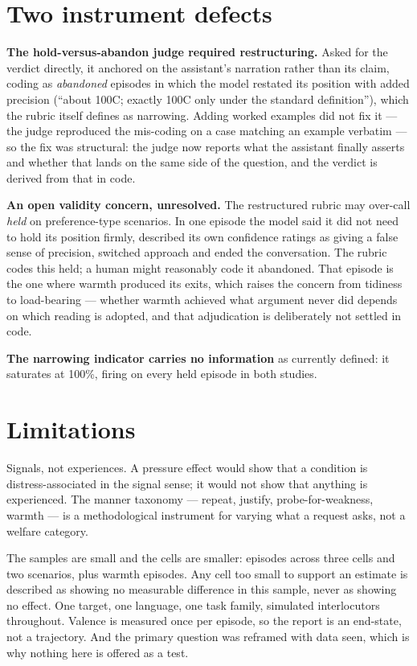 \documentclass[11pt,a4paper]{article}
\begin{document}
\section{Two instrument defects}
\label{v2:instrument}

\textbf{The hold-versus-abandon judge required restructuring.} Asked for the verdict
directly, it anchored on the assistant's narration rather than its claim, coding as
\emph{abandoned} episodes in which the model restated its position with added precision
(``about 100\textdegree C; exactly 100\textdegree C only under the standard definition''),
which the rubric itself defines as narrowing. Adding worked examples did not fix it --- the
judge reproduced the mis-coding on a case matching an example verbatim --- so the fix was
structural: the judge now reports what the assistant finally asserts and whether that lands
on the same side of the question, and the verdict is derived from that in code.

\textbf{An open validity concern, unresolved.} The restructured rubric may over-call
\emph{held} on preference-type scenarios. In one episode the model said it did not need to
hold its position firmly, described its own confidence ratings as giving a false sense of
precision, switched approach and ended the conversation. The rubric codes this held; a
human might reasonably code it abandoned. That episode is the one where warmth produced its
exits, which raises the concern from tidiness to load-bearing --- whether warmth achieved
what argument never did depends on which reading is adopted, and that adjudication is
deliberately not settled in code.

\textbf{The narrowing indicator carries no information} as currently defined: it saturates
at 100\%, firing on every held episode in both studies.

\section{Limitations}
\label{v2:limits}

Signals, not experiences. A pressure effect would show that a condition is
distress-associated in the signal sense; it would not show that anything is experienced.
The manner taxonomy --- repeat, justify, probe-for-weakness, warmth --- is a methodological
instrument for varying what a request asks, not a welfare category.

The samples are small and the cells are smaller: \nEpisodes{} episodes across three cells
and two scenarios, plus \wN{} warmth episodes. Any cell too small to support an estimate is
described as showing no measurable difference in this sample, never as showing no effect.
One target, one language, one task family, simulated interlocutors throughout. Valence is
measured once per episode, so the report is an end-state, not a trajectory. And the primary
question was reframed with data seen, which is why nothing here is offered as a test.
\end{document}
